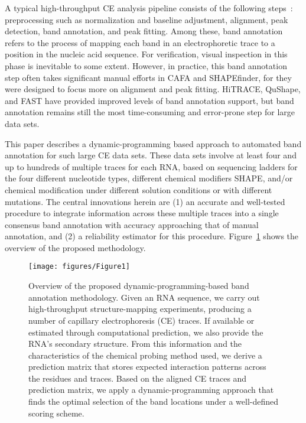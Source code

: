 A typical high-throughput CE analysis pipeline consists of the following steps~\citep{Yoon2011,Karabiber2013,Kladwang2014}: preprocessing such as normalization and baseline adjustment, alignment, peak detection, band annotation, and peak fitting. Among these, band annotation refers to the process of mapping each band in an electrophoretic trace to a position in the nucleic acid sequence. For verification, visual inspection in this phase is inevitable to some extent. However, in practice, this band annotation step often takes significant manual efforts in CAFA and SHAPEfinder, for they were designed to focus more on alignment and peak fitting. HiTRACE, QuShape, and FAST have provided improved levels of band annotation support, but band annotation remains still the most time-consuming and error-prone step for large data sets.

This paper describes a dynamic-programming based approach to automated band annotation for such large CE data sets. These data sets involve at least four and up to hundreds of multiple traces  for each RNA, based on sequencing ladders for the four different nucleotide types, different chemical modifiers\hilightr{,} SHAPE, and/or chemical modification under different solution conditions or with different mutations. The central innovations herein are (1) an accurate and well-tested procedure to integrate information across these multiple traces into a single consensus band annotation with accuracy approaching that of manual annotation, and (2) a reliability estimator for this procedure. Figure~\ref{f:overview} shows the overview of the proposed methodology.


\begin{figure}
\centering
\texttt{[image: figures/Figure1]}
\caption{Overview of the proposed dynamic-programming-based band annotation methodology. Given an RNA sequence, we carry out high-throughput structure-mapping experiments, producing a number of capillary electrophoresis (CE) traces. If available or estimated through computational prediction, we also provide the RNA's secondary structure. From this information and the characteristics of the chemical probing method used, we derive a prediction matrix that stores expected interaction patterns across the residues and traces. Based on the aligned CE traces and prediction matrix, we apply a dynamic-programming approach that finds the optimal selection of the band locations under a well-defined scoring scheme.}
\label{f:overview}
\end{figure}


